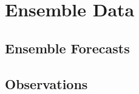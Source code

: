 

\section{Ensemble Data}
\label{edata}


\subsection{Ensemble Forecasts}
\label{emodel}



\subsection{Observations}

